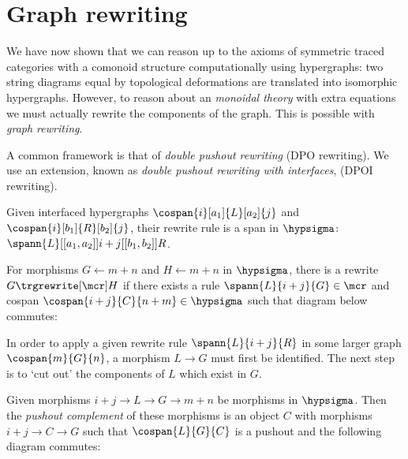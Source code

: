 \section{Graph rewriting}

We have now shown that we can reason up to the axioms of symmetric traced
categories with a comonoid structure computationally using hypergraphs: two
string diagrams equal by topological deformations are translated into isomorphic
hypergraphs.
However, to reason about an \emph{monoidal theory} with extra equations we must
actually rewrite the components of the graph.
This is possible with \emph{graph rewriting}.

A common framework is that of \emph{double pushout rewriting} (DPO rewriting).
We use an extension, known as \emph{double pushout rewriting with interfaces},
(DPOI rewriting).

\begin{definition}
    Given interfaced hypergraphs \(
        \cospan{i}[a_1]{L}[a_2]{j}
    \) and \(
        \cospan{i}[b_1]{R}[b_2]{j}
    \), their rewrite rule is a span in \(\hypsigma\): \(
        \spann{L}[[a_1,a_2]]{i+j}[[b_1,b_2]]{R}
    \).
\end{definition}

\begin{definition}\label{def:dpo}
    For morphisms \(G \leftarrow m+n\) and \(H \leftarrow m+n\) in
    \(\hypsigma\), there is a rewrite \(G \trgrewrite[\mcr] H\) if there
    exists a rule \(
        \spann{L}{i+j}{G} \in \mcr
    \) and cospan \(
        \cospan{i+j}{C}{n+m} \in \hypsigma
    \) such that diagram below commutes:
    \begin{center}
        
    \end{center}
\end{definition}

In order to apply a given rewrite rule \(\spann{L}{i+j}{R}\) in some larger
graph \(\cospan{m}{G}{n}\), a morphism \(L \to G\) must first be identified.
The next step is to `cut out' the components of \(L\) which exist in \(G\).

\begin{definition}\label{def:pushout-complement}
    Given morphisms \(i + j \to L \to G \rightarrow m + n\) be morphisms in
    \(\hypsigma\).
    Then the \emph{pushout complement} of these morphisms is an object \(C\)
    with morphisms \(i + j \to C \to G\) such that \(\cospan{L}{G}{C}\) is a
    pushout and the following diagram commutes:
    \begin{center}
        
    \end{center}
\end{definition}

